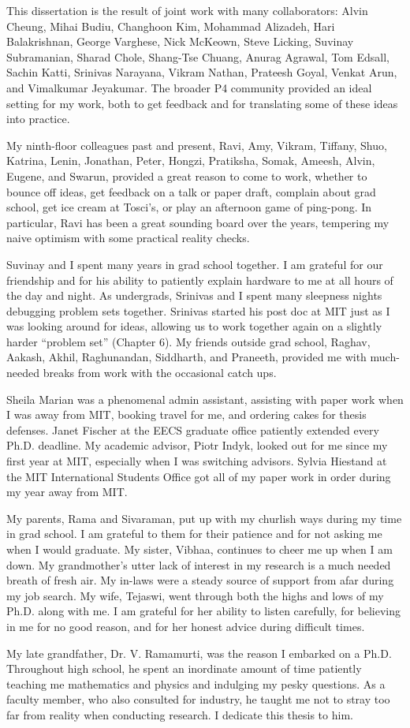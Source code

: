 This dissertation is the result of joint work with many collaborators: Alvin
Cheung, Mihai Budiu, Changhoon Kim, Mohammad Alizadeh, Hari Balakrishnan,
George Varghese, Nick McKeown, Steve Licking, Suvinay Subramanian, Sharad
Chole, Shang-Tse Chuang, Anurag Agrawal, Tom Edsall, Sachin Katti, Srinivas
Narayana, Vikram Nathan, Prateesh Goyal, Venkat Arun, and Vimalkumar Jeyakumar.
The broader P4 community provided an ideal setting for my work, both to get
feedback and for translating some of these ideas into practice. 

My ninth-floor colleagues past and present, Ravi, Amy, Vikram, Tiffany, Shuo,
Katrina, Lenin, Jonathan, Peter, Hongzi, Pratiksha, Somak, Ameesh, Alvin,
Eugene, and Swarun, provided a great reason to come to work, whether to bounce
off ideas, get feedback on a talk or paper draft, complain about grad school,
get ice cream at Tosci's, or play an afternoon game of ping-pong. In
particular, Ravi has been a great sounding board over the years, tempering my
naive optimism with some practical reality checks.

Suvinay and I spent many years in grad school together.  I am grateful for our
friendship and for his ability to patiently explain hardware to me at all hours
of the day and night. As undergrads, Srinivas and I spent many sleepness nights
debugging problem sets together. Srinivas started his post doc at MIT just as I
was looking around for ideas, allowing us to work together again on a slightly
harder ``problem set'' (Chapter 6).  My friends outside grad school, Raghav,
Aakash, Akhil, Raghunandan, Siddharth, and Praneeth, provided me with
much-needed breaks from work with the occasional catch ups.

Sheila Marian was a phenomenal admin assistant, assisting with paper work when
I was away from MIT, booking travel for me, and ordering cakes for thesis
defenses. Janet Fischer at the EECS graduate office patiently extended every
Ph.D.  deadline. My academic advisor, Piotr Indyk, looked out for me since my
first year at MIT, especially when I was switching advisors.  Sylvia Hiestand
at the MIT International Students Office got all of my paper work in order
during my year away from MIT.

My parents, Rama and Sivaraman, put up with my churlish ways during my time in
grad school. I am grateful to them for their patience and for not asking me
when I would graduate. My sister, Vibhaa, continues to cheer me up when I am
down.  My grandmother's utter lack of interest in my research is a much needed
breath of fresh air. My in-laws were a steady source of support from afar
during my job search. My wife, Tejaswi, went through both the highs and lows of
my Ph.D. along with me. I am grateful for her ability to listen carefully, for
believing in me for no good reason, and for her honest advice during difficult
times. 

My late grandfather, Dr. V. Ramamurti, was the reason I embarked on a Ph.D.
Throughout high school, he spent an inordinate amount of time patiently
teaching me mathematics and physics and indulging my pesky questions. As a
faculty member, who also consulted for industry, he taught me not to stray too
far from reality when conducting research. I dedicate this thesis to him.
